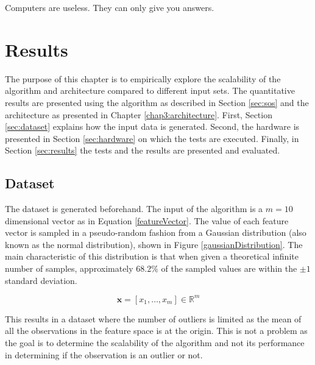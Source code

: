\begin{savequote}[75mm] 
Computers are useless. They can only give you answers.  
\end{savequote}

\chapter{Results \label{chap5:results}}

The purpose of this chapter is to empirically explore the scalability of the algorithm and architecture compared to different input sets. The quantitative results are presented using the algorithm as described in Section \ref{sec:sos} and the architecture as presented in Chapter \ref{chap3:architecture}. First, Section \ref{sec:dataset} explains how the input data is generated. Second, the hardware is presented in Section \ref{sec:hardware} on which the tests are executed. Finally, in Section \ref{sec:results} the tests and the results are presented and evaluated.

\section{Dataset \label{sec:dataset}}
The dataset is generated beforehand. The input of the algorithm is a $m=10$ dimensional vector as in Equation \ref{featureVector}. The value of each feature vector is sampled in a pseudo-random fashion from a Gaussian distribution (also known as the normal distribution), shown in Figure \ref{gaussianDistribution}. The main characteristic of this distribution is that when given a theoretical infinite number of samples, approximately $68.2\%$ of the sampled values are within the $\pm 1$ standard deviation.

\begin{equation}
\textbf{x} = [x_{1},\ldots,x_{m}] \in \mathbb{R}^{m} \label{featureVector}
\end{equation}

This results in a dataset where the number of outliers is limited as the mean of all the observations in the feature space is at the origin. This is not a problem as the goal is to determine the scalability of the algorithm and not its performance in determining if the observation is an outlier or not.

